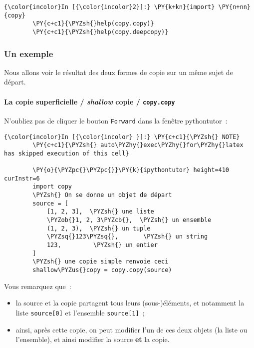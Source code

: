     \begin{Verbatim}[commandchars=\\\{\}]
{\color{incolor}In [{\color{incolor}2}]:} \PY{k+kn}{import} \PY{n+nn}{copy}
        \PY{c+c1}{\PYZsh{}help(copy.copy)}
        \PY{c+c1}{\PYZsh{}help(copy.deepcopy)}
\end{Verbatim}


    \hypertarget{un-exemple}{%
\subsubsection{Un exemple}\label{un-exemple}}

    Nous allons voir le résultat des deux formes de copie sur un même sujet
de départ.

    \hypertarget{la-copie-superficielle-shallow-copie-copy.copy}{%
\paragraph{\texorpdfstring{La copie superficielle / \emph{shallow} copie
/
\texttt{copy.copy}}{La copie superficielle / shallow copie / copy.copy}}\label{la-copie-superficielle-shallow-copie-copy.copy}}

    N'oubliez pas de cliquer le bouton \texttt{Forward} dans la fenêtre
pythontutor~:

    \begin{Verbatim}[commandchars=\\\{\}]
{\color{incolor}In [{\color{incolor} }]:} \PY{c+c1}{\PYZsh{} NOTE}
        \PY{c+c1}{\PYZsh{} auto\PYZhy{}exec\PYZhy{}for\PYZhy{}latex has skipped execution of this cell}
        
        \PY{o}{\PYZpc{}\PYZpc{}}\PY{k}{ipythontutor} height=410 curInstr=6
        import copy
        \PYZsh{} On se donne un objet de départ
        source = [
            [1, 2, 3],  \PYZsh{} une liste
            \PYZob{}1, 2, 3\PYZcb{},  \PYZsh{} un ensemble
            (1, 2, 3),  \PYZsh{} un tuple
            \PYZsq{}123\PYZsq{},       \PYZsh{} un string
            123,         \PYZsh{} un entier
        ]
        \PYZsh{} une copie simple renvoie ceci
        shallow\PYZus{}copy = copy.copy(source)
\end{Verbatim}


    Vous remarquez que~:

\begin{itemize}
\tightlist
\item
  la source et la copie partagent tous leurs (sous-)éléments, et
  notamment la liste \texttt{source{[}0{]}} et l'ensemble
  \texttt{source{[}1{]}}~;
\item
  ainsi, après cette copie, on peut modifier l'un de ces deux objets (la
  liste ou l'ensemble), et ainsi modifier la source \textbf{et} la
  copie.
\end{itemize}

